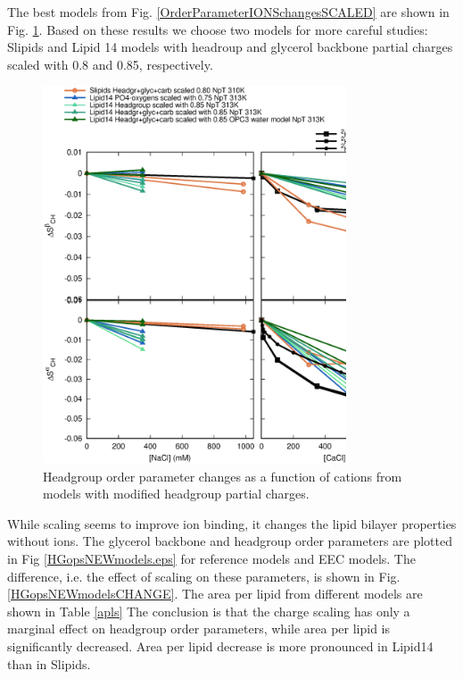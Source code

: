 \documentclass[aps,prl,superscriptaddress,twocolumn]{revtex4}
\begin{document}
The best models from Fig.  \ref{OrderParameterIONSchangesSCALED} are shown in
Fig. \ref{OrderParameterCHANGESnewMODELS}. Based on these results we choose
two models for more careful studies: Slipids and Lipid 14 models with headroup
and glycerol backbone partial charges scaled with 0.8 and 0.85, respectively.
\begin{figure}[]
  \centering
  \includegraphics[width=9.0cm]{../Fig/OrderParameterCHANGESnewMODELS.eps}
  \caption{\label{OrderParameterCHANGESnewMODELS}
    Headgroup order parameter changes as a function of cations from models
    with modified headgroup partial charges.}
\end{figure}



While scaling seems to improve ion binding, it changes the lipid bilayer properties
without ions. The glycerol backbone and headgroup order parameters are plotted in
Fig \ref{HGopsNEWmodels.eps} for reference models and EEC models. The difference,
i.e. the effect of scaling on these parameters, is shown in Fig. \ref{HGopsNEWmodelsCHANGE}.
The area per lipid from different models are shown in Table \ref{apls}
The conclusion is that the charge scaling has only a marginal effect on
headgroup order parameters, while area per lipid is significantly decreased.
Area per lipid decrease is more pronounced in Lipid14 than in Slipids.
\end{document}
